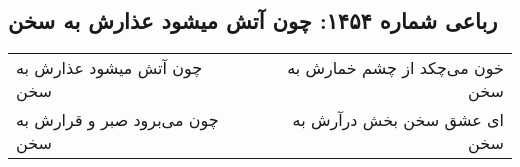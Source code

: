 \begin{center}
\section*{رباعی شماره ۱۴۵۴: چون آتش میشود عذارش به سخن}
\label{sec:1454}
\begin{longtable}{l p{0.5cm} r}
چون آتش میشود عذارش به سخن
&&
خون می‌چکد از چشم خمارش به سخن
\\
چون می‌برود صبر و قرارش به سخن
&&
ای عشق سخن بخش درآرش به سخن
\\
\end{longtable}
\end{center}

